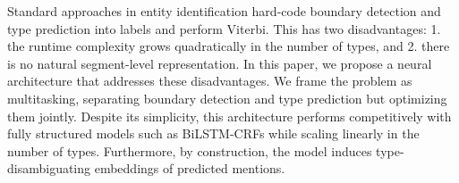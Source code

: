 Standard approaches in entity identification hard-code boundary detection and type prediction into labels and perform Viterbi. This has two disadvantages: 1. the runtime complexity grows quadratically in the number of types, and 2. there is no natural segment-level representation. In this paper, we propose a neural architecture that addresses these disadvantages. We frame the problem as multitasking, separating boundary detection and type prediction but optimizing them jointly. Despite its simplicity, this architecture performs competitively with fully structured models such as BiLSTM-CRFs while scaling linearly in the number of types. Furthermore, by construction, the model induces type-disambiguating embeddings of predicted mentions.
